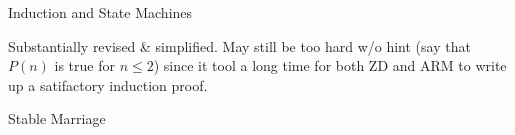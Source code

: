 \documentclass[quiz]{mcs}
\begin{document}
%
%
%

\begin{staffnotes}
\begin{center}
{\large Induction and State Machines}
\end{center}
\end{staffnotes}


\begin{staffnotes}
Substantially revised \& simplified.  May still be too hard w/o hint
(say that $P(n)$ is true for $n \leq 2$) since it tool a long time for
both ZD and ARM to write up a satifactory induction proof.
\end{staffnotes}


%
%
%
%

\begin{staffnotes}
\begin{center}
{\large Stable Marriage}
\end{center}
\end{staffnotes}

\end{document}
